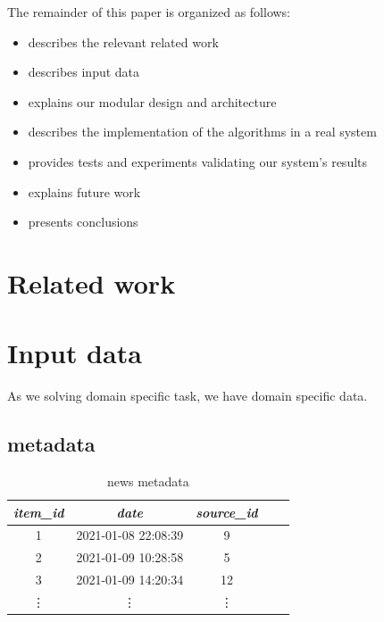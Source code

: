 \documentclass{article}
\begin{document}
        The remainder of this paper is organized as follows:
        
            \begin{itemize}
                \item {} describes the relevant related work
                \item {} describes input data
                \item {} explains our modular design and architecture
                \item {} describes the implementation of the algorithms in a real system
                \item {} provides tests and experiments validating
our system’s results
                \item {} explains future work
                \item {} presents conclusions
            \end{itemize}

    \section{Related work}
    \label{sec:related}

    \section{Input data}
    \label{sec:input}

    As we solving domain specific task, we have domain specific data.

    \subsection*{metadata}

    \begin{table}[h]
        \centering
        \begin{tabular}{ccccc}
            \toprule

            \emph{item\_id} & \emph{date} & \emph{source\_id} \\\midrule

            1 & 2021-01-08 22:08:39 & 9  \\
            2 & 2021-01-09 10:28:58 & 5  \\
            3 & 2021-01-09 14:20:34 & 12 \\
            \vdots & \vdots & \vdots  \\\bottomrule


         \hline
        \end{tabular}

        \caption{news metadata}
        \label{tab:meta}
    \end{table}
\end{document}
